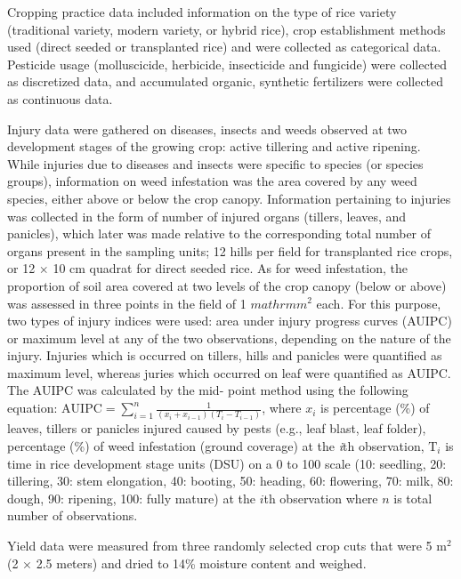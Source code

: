 Cropping practice data included information on the type of rice variety (traditional variety, modern variety, or hybrid rice), crop establishment methods used (direct seeded or transplanted rice) and were collected as categorical data. Pesticide usage (molluscicide, herbicide, insecticide and fungicide) were collected as discretized data, and accumulated organic, synthetic fertilizers were collected as continuous data.

Injury data were gathered on diseases, insects and weeds observed at two development stages of the growing crop: active tillering and active ripening. While injuries due to diseases and insects were specific to species (or species groups), information on weed infestation was the area covered by any weed species, either above or below the crop canopy. Information pertaining to injuries was collected in the form of number of injured organs (tillers, leaves, and panicles), which later was made relative to the corresponding total number of organs present in the sampling units; 12 hills per field for transplanted rice crops, or 12 $\times$ 10 cm quadrat for direct seeded rice. As for weed infestation, the proportion of soil area covered at two levels of the crop canopy (below or above) was assessed in three points in the field of 1 $mathrm{m}^{2}$ each. For this purpose, two types of injury indices were used: area under injury progress curves (AUIPC) or maximum level at any of the two observations, depending on the nature of the injury. Injuries which is occurred on tillers, hills and panicles were quantified as maximum level, whereas juries which occurred on leaf were quantified as AUIPC. The AUIPC was calculated by the mid- point method using the following equation: $\mathrm{AUIPC} = \sum\limits_{i=1}^n\frac{1}{(x_{i} + x_{i-1})(T_{i} - T_{i-1})}$, where $x_i$ is percentage (\%) of leaves, tillers or panicles injured caused by pests (e.g., leaf blast, leaf folder), percentage (\%) of weed infestation (ground coverage) at the \textit{i}th observation, $\mathrm{T}_{i}$ is time in rice development stage units (DSU) on a 0 to 100 scale (10: seedling, 20: tillering, 30: stem elongation, 40: booting, 50: heading, 60: flowering, 70: milk, 80: dough, 90: ripening, 100: fully mature) at the $i$th observation where $n$ is total number of observations.

Yield data were measured from three randomly selected crop cuts that were 5 $\mathrm{m}^{2}$ (2 $\times$ 2.5 meters) and dried to 14\% moisture content and weighed.

